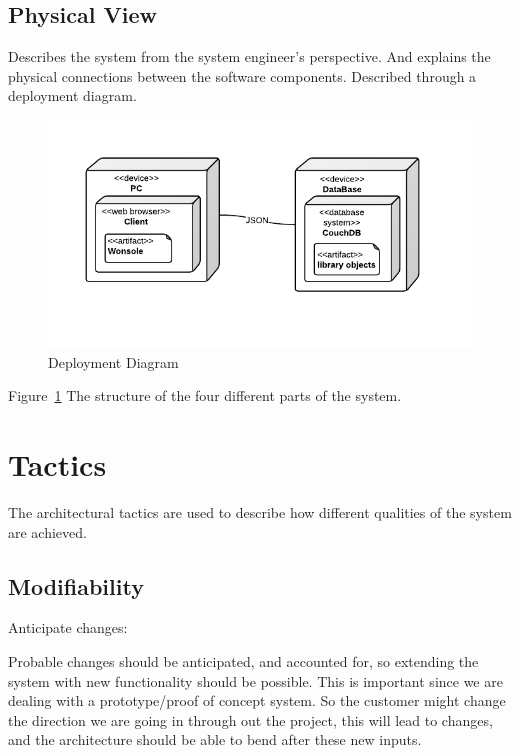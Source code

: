 \subsection{Physical View}
Describes the system from the system engineer's perspective. And explains the physical connections between the software components. Described through a deployment diagram. 

\begin{figure}
\centering
\includegraphics[width=6in]{image/DeploymentDiagram.png}
\caption{Deployment Diagram}
\label{figure:deploymentDiagram}
\end{figure}

Figure~\ref{figure:deploymentDiagram} The structure of the four different parts of the system.





\section{Tactics}
The architectural tactics are used to describe how different qualities of the system are achieved. 

\subsection{Modifiability}
Anticipate changes:

Probable changes should be anticipated, and accounted for, so extending the system with new functionality should be possible. This is important since we are dealing with a prototype/proof of concept system. So the customer might change the direction we are going in through out the project, this will lead to changes, and the architecture should be able to bend after these new inputs. 

